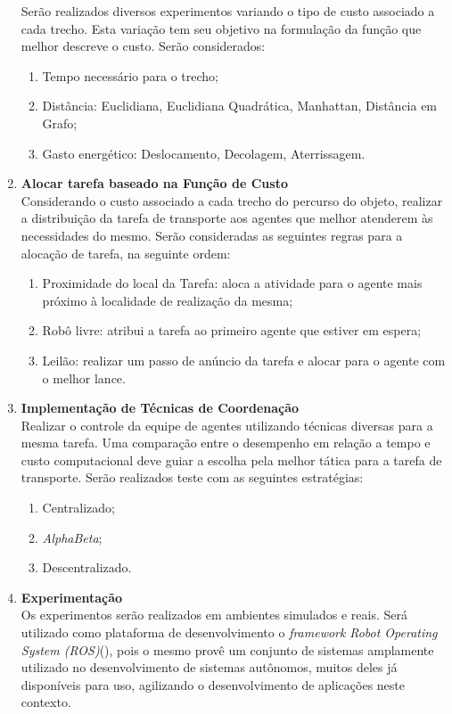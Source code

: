 \begin{enumerate}
    Serão realizados diversos experimentos variando o tipo de custo associado a cada trecho. Esta variação tem seu objetivo na formulação da função que melhor descreve o custo. Serão considerados:
        \begin{enumerate}
            \item Tempo necessário para o trecho;
            \item Distância: Euclidiana, Euclidiana Quadrática, Manhattan, Distância em Grafo;
            \item Gasto energético: Deslocamento, Decolagem, Aterrissagem.
        \end{enumerate}

    \item \textbf{Alocar tarefa baseado na Função de Custo}\\
    Considerando o custo associado a cada trecho do percurso do objeto, realizar a distribuição da tarefa de transporte aos agentes que melhor atenderem às necessidades do mesmo. Serão consideradas as seguintes regras para a alocação de tarefa, na seguinte ordem:
        \begin{enumerate}
            \item Proximidade do local da Tarefa: aloca a atividade para o agente mais próximo à localidade de realização da mesma;
            \item Robô livre: atribui a tarefa ao primeiro agente que estiver em espera;
            \item Leilão: realizar um passo de anúncio da tarefa e alocar para o agente com o melhor lance.
        \end{enumerate}

    \item \textbf{Implementação de Técnicas de Coordenação}\\
    Realizar o controle da equipe de agentes utilizando técnicas diversas para a mesma tarefa. Uma comparação entre o desempenho em relação a tempo e custo computacional deve guiar a escolha pela melhor tática para a tarefa de transporte. Serão realizados teste com as seguintes estratégias:
        \begin{enumerate}
            \item Centralizado;
            \item \emph{AlphaBeta};
            \item Descentralizado.
        \end{enumerate}

    \item \textbf{Experimentação}\\
    Os experimentos serão realizados em ambientes simulados e reais. Será utilizado como plataforma de desenvolvimento o \emph{framework} \emph{Robot Operating System (ROS)}(\cite{ROS}), pois o mesmo provê um conjunto de sistemas amplamente utilizado no desenvolvimento de sistemas autônomos, muitos deles já disponíveis para uso, agilizando o desenvolvimento de aplicações neste contexto.


\end{enumerate}
